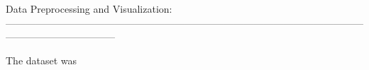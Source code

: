 \documentclass[100pt]{article}
\begin{document}
\begin{normalsize}\color {bluino}
\hfill\break

\noindent Data Preprocessing and Visualization:\\
---------------------------------------------------------------------------------------------------------------------------------------------
\end{normalsize}

\begin{normalsize}

The dataset was 

\end{normalsize}








\end{document}
